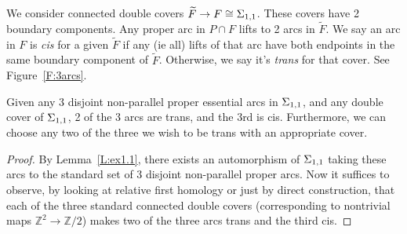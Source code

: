 We consider connected double covers $\widetilde{F} \to F \cong \Sigma_{1,1}$.
These covers have 2 boundary components. Any proper arc in $P \cap F$ lifts to
2 arcs in $\widetilde{F}$.  We say an arc in $F$ is \emph{cis} for a given
$\widetilde{F}$ if any (ie all) lifts of that arc have both endpoints in the
same boundary component of $\widetilde{F}$.  Otherwise, we say it's
\emph{trans} for that cover. See Figure~\ref{F:3arcs}.


\begin{lemma}\label{L:ex1.2}

Given any 3 disjoint non-parallel proper essential arcs in $\Sigma_{1,1}$, and any
double cover of $\Sigma_{1,1}$, 2 of the 3 arcs are trans, and the 3rd is cis.
Furthermore, we can choose any two of the three we wish to be trans with an
appropriate cover.

\end{lemma}
\begin{proof}

By Lemma~\ref{L:ex1.1}, there exists an automorphism of $\Sigma_{1,1}$ taking
these arcs to the standard set of 3 disjoint non-parallel proper arcs. Now it
suffices to observe, by looking at relative first homology or just by direct
construction, that each of the three standard connected double covers
(corresponding to nontrivial maps $\mathbb{Z}^2 \to \mathbb{Z}/2$) makes two of
the three arcs trans and the third cis.

\end{proof}

